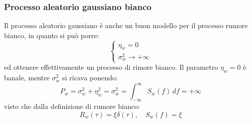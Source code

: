 \documentclass[a4paper,11pt]{article}
\begin{document}
\subsubsection{Processo aleatorio gaussiano bianco}
Il processo aleatorio gaussiano è anche un buon modello per il processo rumore bianco, in quanto si può porre:
$$
\begin{cases}
	\eta_w = 0 \\
	\sigma_w^2 \rightarrow + \infty
\end{cases}
$$
ed ottenere effettivamente un processo di rimore bianco. Il parametro $\eta_w = 0$ è banale, mentre $\sigma_w^2$ si ricava ponendo:
$$
P_w = \sigma_w^2 + \eta_w^2 = \sigma_w^2 = \int_{-\infty}^{\infty} S_w(f) \, df = +\infty
$$
visto che dalla definizione di rumore bianco:
$$
R_w(\tau) = \xi \delta(\tau) , \quad S_w(f) = \xi
$$
\end{document}

